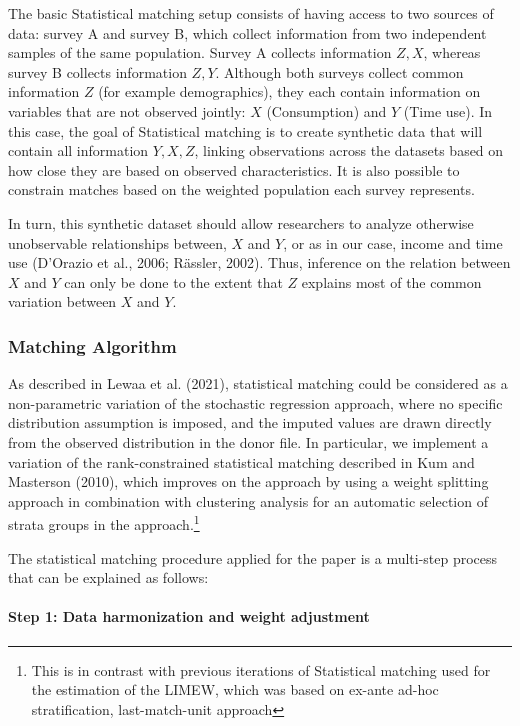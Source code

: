 \documentclass[
  11pt,
]{article}
\let\oldparagraph\paragraph
\renewcommand{\paragraph}[1]{\oldparagraph{#1}\mbox{}}
\begin{document}
The basic Statistical matching setup consists of having access to two
sources of data: survey A and survey B, which collect information from
two independent samples of the same population. Survey A collects
information \(Z, X\), whereas survey B collects information \(Z, Y\).
Although both surveys collect common information \(Z\) (for example
demographics), they each contain information on variables that are not
observed jointly: \(X\) (Consumption) and \(Y\) (Time use). In this
case, the goal of Statistical matching is to create synthetic data that
will contain all information \(Y,X, Z\), linking observations across the
datasets based on how close they are based on observed characteristics.
It is also possible to constrain matches based on the weighted
population each survey represents.

In turn, this synthetic dataset should allow researchers to analyze
otherwise unobservable relationships between, \(X\) and \(Y\), or as in
our case, income and time use (D'Orazio et al., 2006; Rässler, 2002).
Thus, inference on the relation between \(X\) and \(Y\) can only be done
to the extent that \(Z\) explains most of the common variation between
\(X\) and \(Y\).

\subsubsection{Matching Algorithm}\label{matching-algorithm}

As described in Lewaa et al. (2021), statistical matching could be
considered as a non-parametric variation of the stochastic regression
approach, where no specific distribution assumption is imposed, and the
imputed values are drawn directly from the observed distribution in the
donor file. In particular, we implement a variation of the
rank-constrained statistical matching described in Kum and Masterson
(2010), which improves on the approach by using a weight splitting
approach in combination with clustering analysis for an automatic
selection of strata groups in the approach.\footnote{ This is in
  contrast with previous iterations of Statistical matching used for the
  estimation of the LIMEW, which was based on ex-ante ad-hoc
  stratification, last-match-unit approach}

The statistical matching procedure applied for the paper is a multi-step
process that can be explained as follows:

\paragraph{Step 1: Data harmonization and weight
adjustment}\label{step-1-data-harmonization-and-weight-adjustment}
\end{document}
